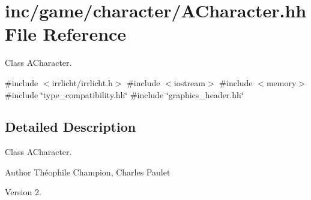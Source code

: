 \hypertarget{ACharacter_8hh}{}\section{inc/game/character/\+A\+Character.hh File Reference}
\label{ACharacter_8hh}


Class A\+Character.  


{\ttfamily \#include $<$irrlicht/irrlicht.\+h$>$}\newline
{\ttfamily \#include $<$iostream$>$}\newline
{\ttfamily \#include $<$memory$>$}\newline
{\ttfamily \#include \char`\"{}type\+\_\+compatibility.\+hh\char`\"{}}\newline
{\ttfamily \#include \char`\"{}graphics\+\_\+header.\+hh\char`\"{}}\newline


\subsection{Detailed Description}
Class A\+Character. 

\begin{DoxyAuthor}{Author}
Théophile Champion, Charles Paulet 
\end{DoxyAuthor}
\begin{DoxyVersion}{Version}
2. 
\end{DoxyVersion}
